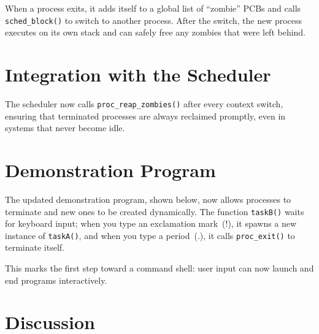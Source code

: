 When a process exits, it adds itself to a global list of “zombie” PCBs and calls
\texttt{sched\_block()} to switch to another process.  After the switch, the new
process executes on its own stack and can safely free any zombies that were left
behind.

\begin{figure}[H]
\centering

\end{figure}

\section{Integration with the Scheduler}

The scheduler now calls \texttt{proc\_reap\_zombies()} after every context
switch, ensuring that terminated processes are always reclaimed promptly,
even in systems that never become idle.

\begin{figure}[H]
\centering

\end{figure}

\section{Demonstration Program}

The updated demonstration program, shown below, now allows processes to
terminate and new ones to be created dynamically.  The function
\texttt{taskB()} waits for keyboard input; when you type an exclamation mark~(!),
it spawns a new instance of \texttt{taskA()}, and when you type a period~(.),
it calls \texttt{proc\_exit()} to terminate itself.

This marks the first step toward a command shell: user input can now launch
and end programs interactively.

\begin{figure}[H]
\centering

\end{figure}

\section{Discussion}

